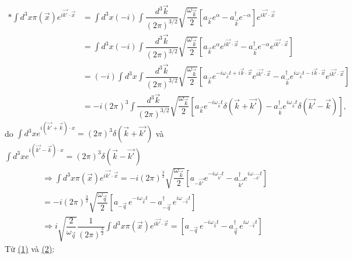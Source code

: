 \documentclass{report}
\begin{document}
\begin{align*}
	\ast\int d^3x \pi(\vec{x}) e^{i\vec{k'}\cdot\vec{x}} & = \int d^3x (-i)\int \dfrac{d^3\vec{k}}{(2\pi)^{3/2}} \sqrt{\dfrac{\omega_{\vec{k}}}{2}} \left[ a_{\vec{k}}e^\alpha - a_{\vec{k}}^\dagger e^{-\alpha} \right] e^{i\vec{k'}\cdot\vec{x}}                                                                                                       \\
	                                                     & = \int d^3x (-i)\int \dfrac{d^3\vec{k}}{(2\pi)^{3/2}} \sqrt{\dfrac{\omega_{\vec{k}}}{2}} \left[ a_{\vec{k}}e^\alpha e^{i\vec{k'}\cdot\vec{x}}  - a_{\vec{k}}^\dagger e^{-\alpha}e^{i\vec{k'}\cdot\vec{x}} \right]                                                                             \\
	                                                     & = (-i)\int d^3x \int \dfrac{d^3\vec{k}}{(2\pi)^{3/2}} \sqrt{\dfrac{\omega_{\vec{k}}}{2}} \left[ a_{\vec{k}}e^{ -i\omega_{\vec{k}} t + i\vec{k}\cdot\vec{x}} e^{i\vec{k'}\cdot\vec{x}}  - a_{\vec{k}}^\dagger e^{ i\omega_{\vec{k}} t - i\vec{k}\cdot\vec{x}}e^{i\vec{k'}\cdot\vec{x}} \right] \\
	                                                     & = -i(2\pi)^3 \int \dfrac{d^3\vec{k}}{(2\pi)^{3/2}} \sqrt{\dfrac{\omega_{\vec{k}}}{2}} \left[ a_{\vec{k}}e^{-i\omega_{\vec{k}}t} \delta(\vec{k}+\vec{k'}) - a_{\vec{k}}^\dagger e^{i\omega_{\vec{k}}t}\delta(\vec{k'}-\vec{k}) \right],
\end{align*}
do $\displaystyle \int d^3x e^{i(\vec{k'}+\vec{k})\cdot x} = (2\pi)^3\delta(\vec{k}+\vec{k'})$ và $\displaystyle \int d^3x e^{i(\vec{k'}-\vec{k})\cdot x} = (2\pi)^3\delta(\vec{k}-\vec{k'})$
\begin{align}
	&\Rightarrow\int d^3x \pi(\vec{x}) e^{i\vec{k'}\cdot\vec{x}}
	  = -i(2\pi)^{\frac{3}{2}}\sqrt{\dfrac{\omega_{\vec{k}}}{2}}\left[ a_{-\vec{k'}}e^{-i\omega_{\vec{k'}}t} - a_{\vec{k'}}^{\dagger}e^{i\omega_{\vec{-k'}}t} \right]\nonumber\\
	&=-i(2\pi)^{\frac{3}{2}}\sqrt{\dfrac{\omega_{\vec{q}}}{2}}\left[ a_{-\vec{q}}\,e^{-i\omega_{\vec{q}}t} - a_{-\vec{q}}^{\dagger}\,e^{i\omega_{-\vec{q}}t} \right]\nonumber \\
	 &\Rightarrow i\sqrt{\dfrac{2}{\omega_{\vec{q}}}}\dfrac{1}{(2\pi)^\frac{3}{2}}\int d^3x \pi(\vec{x}) e^{i\vec{k'}\cdot\vec{x}}
	  = \left[ a_{-\vec{q}}\,e^{-i\omega_{\vec{q}}t} - a_{\vec{q}}^{\dagger}\,e^{i\omega_{-\vec{q}}t} \right] \label{eq2}
\end{align}
Từ \hyperref[eq1]{(1)} và \hyperref[eq2]{(2)}:
\end{document}
